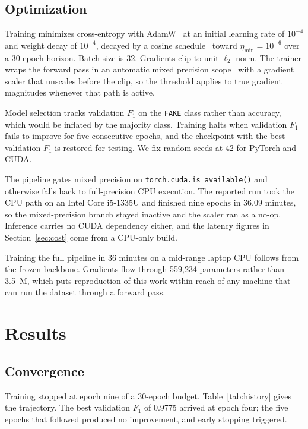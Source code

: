 \documentclass[conference]{IEEEtran}
\begin{document}
\subsection{Optimization}

Training minimizes cross-entropy with AdamW~\cite{loshchilov2019adamw} at an
initial learning rate of $10^{-4}$ and weight decay of $10^{-4}$, decayed by a
cosine schedule~\cite{loshchilov2017sgdr} toward $\eta_{\min} = 10^{-6}$ over a
30-epoch horizon. Batch size is 32. Gradients clip to unit $\ell_2$ norm. The
trainer wraps the forward pass in an automatic mixed precision
scope~\cite{micikevicius2018mixed} with a gradient scaler that unscales before
the clip, so the threshold applies to true gradient magnitudes whenever that
path is active.

Model selection tracks validation $F_1$ on the \texttt{FAKE} class rather than
accuracy, which would be inflated by the majority class. Training halts when
validation $F_1$ fails to improve for five consecutive epochs, and the
checkpoint with the best validation $F_1$ is restored for testing. We fix random
seeds at 42 for PyTorch and CUDA.

The pipeline gates mixed precision on \texttt{torch.cuda.is\_available()} and
otherwise falls back to full-precision CPU execution. The reported run took the
CPU path on an Intel Core i5-1335U and finished nine epochs in 36.09 minutes, so
the mixed-precision branch stayed inactive and the scaler ran as a no-op.
Inference carries no CUDA dependency either, and the latency figures in
Section~\ref{sec:cost} come from a CPU-only build.

Training the full pipeline in 36 minutes on a mid-range laptop CPU follows from
the frozen backbone. Gradients flow through 559{,}234 parameters rather than
3.5~M, which puts reproduction of this work within reach of any machine that can
run the dataset through a forward pass.

\section{Results}
\label{sec:results}

\subsection{Convergence}

Training stopped at epoch nine of a 30-epoch budget. Table~\ref{tab:history}
gives the trajectory. The best validation $F_1$ of 0.9775 arrived at epoch four;
the five epochs that followed produced no improvement, and early stopping
triggered.
\end{document}

